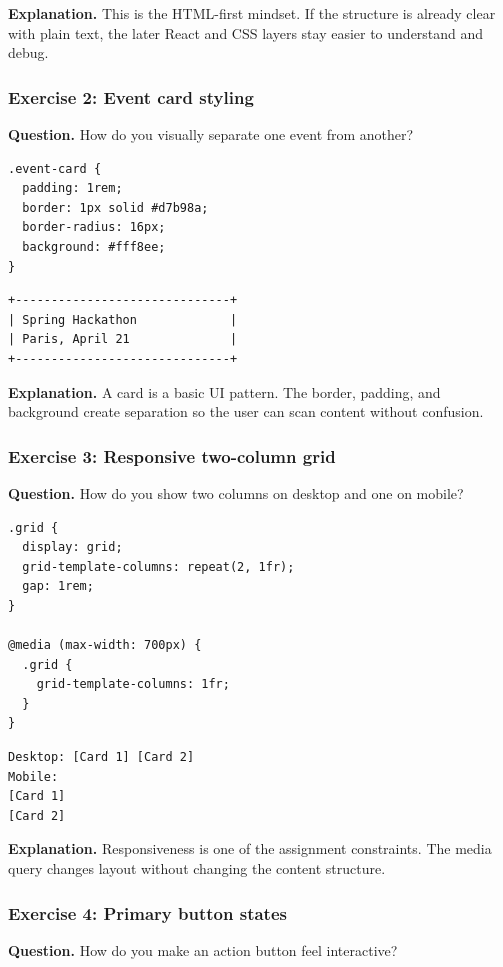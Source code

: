 \documentclass[11pt,a4paper]{article}
\begin{document}
\textbf{Explanation.} This is the HTML-first mindset. If the structure is already clear with plain text, the later React and CSS layers stay easier to understand and debug.

\subsubsection*{Exercise 2: Event card styling}
\textbf{Question.} How do you visually separate one event from another?

\begin{lstlisting}[style=code]
.event-card {
  padding: 1rem;
  border: 1px solid #d7b98a;
  border-radius: 16px;
  background: #fff8ee;
}
\end{lstlisting}

\begin{lstlisting}[style=terminal]
+------------------------------+
| Spring Hackathon             |
| Paris, April 21              |
+------------------------------+
\end{lstlisting}

\textbf{Explanation.} A card is a basic UI pattern. The border, padding, and background create separation so the user can scan content without confusion.

\subsubsection*{Exercise 3: Responsive two-column grid}
\textbf{Question.} How do you show two columns on desktop and one on mobile?

\begin{lstlisting}[style=code]
.grid {
  display: grid;
  grid-template-columns: repeat(2, 1fr);
  gap: 1rem;
}

@media (max-width: 700px) {
  .grid {
    grid-template-columns: 1fr;
  }
}
\end{lstlisting}

\begin{lstlisting}[style=terminal]
Desktop: [Card 1] [Card 2]
Mobile:
[Card 1]
[Card 2]
\end{lstlisting}

\textbf{Explanation.} Responsiveness is one of the assignment constraints. The media query changes layout without changing the content structure.

\subsubsection*{Exercise 4: Primary button states}
\textbf{Question.} How do you make an action button feel interactive?
\end{document}
